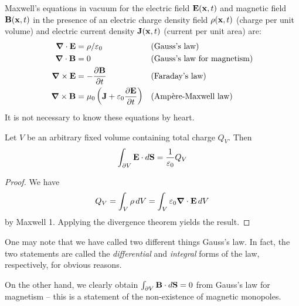\documentclass{../template/note}
\begin{document}
    \begin{proposition}
        Maxwell's equations in vacuum for the electric field \(\V E(\V x, t)\) and magnetic field \(\V B(\V x, t)\) in the presence of an electric charge density field \(\rho(\V x, t)\) (charge per unit volume) and electric current density \(\V J(\V x, t)\) (current per unit area) are:
        \begin{align*}
            \div \V E &= \rho/\eps_0 && \text{(Gauss's law)} \\
            \div \V B &= 0 && \text{(Gauss's law for magnetism)} \\ 
            \curl \V E &= -\pd{\V B} t && \text{(Faraday's law)} \\
            \curl \V B &= \mu_0\left(\V J + \eps_0 \pd{\V E} t\right) && \text{(Amp\`ere-Maxwell law)}
        \end{align*}
        It is not necessary to know these equations by heart.
    \end{proposition}
    
    \begin{proposition*} 
        Let \(V\) be an arbitrary fixed volume containing total charge \(Q_V\). Then
        \begin{align*}
            \int_{\pr V} \V E \cdot d \V S = \frac 1 {\eps_0} Q_V
        \end{align*}
    \end{proposition*}
    
    \begin{proof}
        We have
        \begin{align*}
            Q_V = \int_V \rho \D V = \int_V \eps_0 \div \V E \D V
        \end{align*}
        by Maxwell 1. Applying the divergence theorem yields the result.
    \end{proof}
    
    \begin{remark*}
        One may note that we have called two different things Gauss's law. In fact, the two statements are called the \emph{differential} and \emph{integral} forms of the law, respectively, for obvious reasons.
    \end{remark*}
    
    \begin{remark*}
        On the other hand, we clearly obtain \(\int_{\pr V} \V B \cdot d\V S = 0\) from Gauss's law for magnetism -- this is a statement of the non-existence of magnetic monopoles.
    \end{remark*}
    
\end{document}
